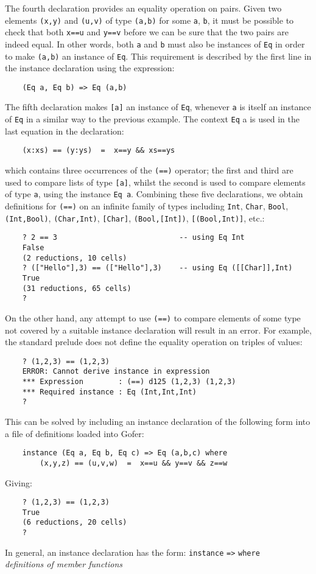 \IT  The fourth declaration provides an equality  operation  on  pairs.
     Given two elements \verb"(x,y)" and \verb"(u,v)" 
     of type \verb"(a,b)" for some \verb"a", \verb"b", it
     must be possible to check that both \verb"x==u" and \verb"y==v" 
     before we can be
     sure that the two pairs are indeed equal.  In other words, both  \verb"a"
     and \verb"b" must also be instances of \verb"Eq"  
     in  order  to  make  \verb"(a,b)"  an
     instance of \verb"Eq".  This requirement is described by the  first  line
     in the instance declaration using the expression:
\begin{verbatim}
    (Eq a, Eq b) => Eq (a,b)
\end{verbatim}

\IT  The fifth declaration makes \verb"[a]" an instance of \verb"Eq", 
     whenever  \verb"a"  is
     itself an instance  of  \verb"Eq"  in  a  similar  way  to  the  previous
     example.  The context \verb"Eq" a is used in the  last  equation  in  the
     declaration:
\begin{verbatim}
    (x:xs) == (y:ys)  =  x==y && xs==ys
\end{verbatim}
     which contains three occurrences of the \verb"(==)" operator;  the  first
     and third are used to compare lists of type \verb"[a]", whilst the second
     is used to compare elements of type \verb"a", using the 
     instance \verb"Eq a".
\EI
Combining these five declarations, we obtain definitions for \verb"(==)" on an
infinite  family  of  types  including  
\verb"Int",  \verb"Char",  \verb"Bool",  \verb"(Int,Bool)",
\verb"(Char,Int)", \verb"[Char]", 
\verb"(Bool,[Int])", \verb"[(Bool,Int)]", etc.:
\begin{verbatim}
    ? 2 == 3                            -- using Eq Int
    False
    (2 reductions, 10 cells)
    ? (["Hello"],3) == (["Hello"],3)    -- using Eq ([[Char]],Int)
    True
    (31 reductions, 65 cells)
    ?
\end{verbatim}
On the other hand, any attempt to use \verb"(==)" to compare elements of  some
type not covered by a suitable instance declaration will result  in  an
error.  For example, the standard prelude does not define the  equality
operation on triples of values:
\begin{verbatim}
    ? (1,2,3) == (1,2,3)
    ERROR: Cannot derive instance in expression
    *** Expression        : (==) d125 (1,2,3) (1,2,3)
    *** Required instance : Eq (Int,Int,Int)
    ?
\end{verbatim}
This can be solved by including an instance  declaration  of  the  following form
into a file of definitions loaded into Gofer:
\begin{verbatim}
    instance (Eq a, Eq b, Eq c) => Eq (a,b,c) where
        (x,y,z) == (u,v,w)  =  x==u && y==v && z==w
\end{verbatim}
Giving:
\begin{verbatim}
    ? (1,2,3) == (1,2,3)
    True
    (6 reductions, 20 cells)
    ?
\end{verbatim}
In general, an instance declaration has the form:
\BQ
    \verb"instance"   \verb"=>"   \verb"where"\\
    {\em definitions of member functions}
\EQ

